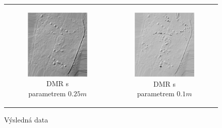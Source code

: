 \begin{figure}[H]
\begin{tabular}{cc}
        \begin{subfigure}[b]{0.35\textwidth}
            \centering
            \includegraphics[width=\textwidth]{images/IM_025m.png}
            \caption{DMR s parametrem $0.25 m$}
        \end{subfigure} &
        \begin{subfigure}[b]{0.35\textwidth}
            \centering
            \includegraphics[width=\textwidth]{images/IM_01m.png}
            \caption{DMR s parametrem $0.1 m$}
        \end{subfigure}
    \end{tabular}
    \caption{Výsledná data}
    \label{fig:grid}
\end{figure}